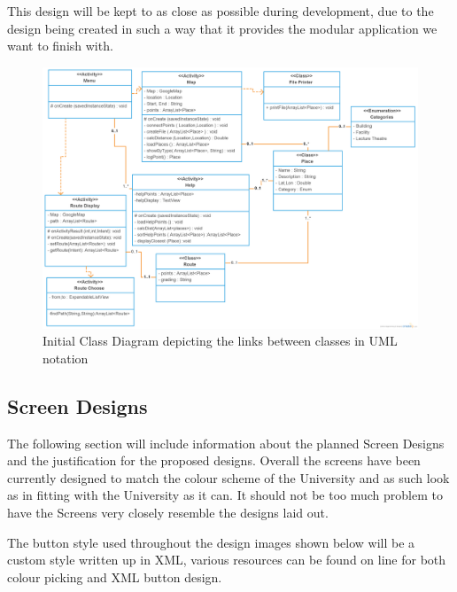 This design will be kept to as close as possible during development, due to the design being created in such a way that it provides the modular application we want to finish with. 
\begin{figure}
\includegraphics[scale=0.25]{Design/Class.png}
\caption[Initial Class Diagram]{Initial Class Diagram depicting the links between classes in UML notation}
\end{figure}
\newpage
\subsection{Screen Designs}
The following section will include information about the planned Screen Designs and the justification for the proposed designs. Overall the screens have been currently designed to match the colour scheme of the University and as such look as in fitting with the University as it can. It should not be too much problem to have the Screens very closely resemble the designs laid out. 

The button style used throughout the design images shown below will be a custom style written up in XML, various resources can be found on line for both colour picking and XML button design. 
